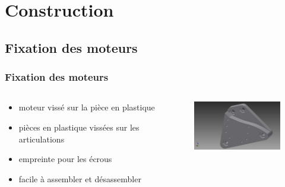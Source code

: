 \section{Construction}

\subsection{Fixation des moteurs}
\begin{frame}
  \frametitle{Fixation des moteurs}
  \begin{columns}[c]
    \begin{column}[c]{.5\textwidth}
      \begin{itemize}
        \item moteur vissé sur la pièce en plastique
        \item pièces en plastique vissées sur les articulations
        \item empreinte pour les écrous
        \item facile à assembler et désassembler
      \end{itemize}
    \end{column}
    \begin{column}[c]{.5\textwidth}  
      \begin{figure}
        			\includegraphics[width=5cm]{../img/part_middle_v1.jpg}
      \end{figure}
    \end{column}
  \end{columns}
\end{frame}

